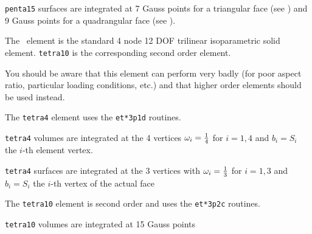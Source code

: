 {\tt penta15} surfaces are integrated at 7 Gauss points for a triangular face (see \tetrb) and 9 Gauss points for a quadrangular face (see \hexav).


The \tetra\   element is the standard 4 node 12 DOF trilinear isoparametric solid element. {\tt tetra10} is the corresponding second order element.

You should be aware that this element can perform very badly (for poor aspect ratio, particular loading conditions, etc.) and that higher order elements should be used instead. 

The {\tt tetra4} element uses the {\tt et*3p1d} routines.

{\tt tetra4} volumes are integrated at the 4 vertices $\omega_i = {1 \over 4}$ for $i=1,4$ and $b_i=S_i$   the $i$-th element vertex.

{\tt tetra4} surfaces are integrated at the 3 vertices with $\omega_i = {1 \over 3}$ for $i=1,3$ and $b_i=S_i$  the  $i$-th vertex of the actual face

The {\tt tetra10} element is second order and uses the {\tt et*3p2c} routines.

{\tt tetra10} volumes are integrated at 15 Gauss points

